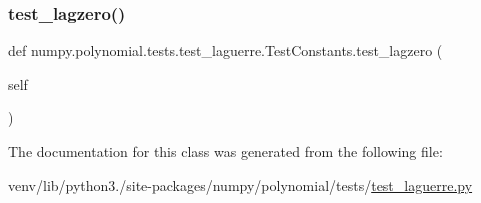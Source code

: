 \subsubsection{\texorpdfstring{test\+\_\+lagzero()}{test\_lagzero()}}
{\footnotesize\ttfamily def numpy.\+polynomial.\+tests.\+test\+\_\+laguerre.\+Test\+Constants.\+test\+\_\+lagzero (\begin{DoxyParamCaption}\item[{}]{self }\end{DoxyParamCaption})}



The documentation for this class was generated from the following file\+:\begin{DoxyCompactItemize}
\item 
venv/lib/python3./site-\/packages/numpy/polynomial/tests/\hyperlink{test__laguerre_8py}{test\+\_\+laguerre.\+py}\end{DoxyCompactItemize}
